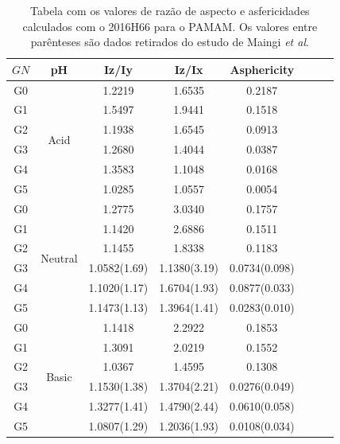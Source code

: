 \begin{table}
\centering
    \begin{tabular}{cccccccc}
 \hline
 $GN$     & pH  & Iz/Iy &   Iz/Ix   & Asphericity\\
 \hline
 \hline 
 G0     &  \multirow{6}{*}{Acid}    &   1.2219& 1.6535& 0.2187\\
 G1     &                           &   1.5497& 1.9441& 0.1518\\
 G2     &                           &   1.1938& 1.6545& 0.0913\\
 G3     &                           &   1.2680& 1.4044& 0.0387\\
 G4     &                           &   1.3583& 1.1048& 0.0168\\
 G5     &                           &   1.0285& 1.0557& 0.0054\\
 \hline 
 G0     &  \multirow{6}{*}{Neutral} &   1.2775& 3.0340& 0.1757\\
 G1     &                           &   1.1420& 2.6886& 0.1511\\
 G2     &                           &   1.1455& 1.8338& 0.1183\\
 G3     &                           &   1.0582(1.69)& 1.1380(3.19)& 0.0734(0.098)\\
 G4     &                           &   1.1020(1.17)& 1.6704(1.93)& 0.0877(0.033)\\
 G5     &                           &   1.1473(1.13)& 1.3964(1.41)& 0.0283(0.010)\\
 \hline 
 G0     &  \multirow{6}{*}{Basic}   &   1.1418& 2.2922& 0.1853\\
 G1     &                           &   1.3091& 2.0219& 0.1552\\
 G2     &                           &   1.0367& 1.4595& 0.1308\\
 G3     &                           &   1.1530(1.38)& 1.3704(2.21)& 0.0276(0.049)\\
 G4     &                           &   1.3277(1.41)& 1.4790(2.44)& 0.0610(0.058)\\
 G5     &                           &   1.0807(1.29)& 1.2036(1.93)& 0.0108(0.034)\\
 \hline
    \end{tabular}
\caption{Tabela com os valores de razão de aspecto e asfericidades calculados com o 2016H66 para o PAMAM.
Os valores entre parênteses são dados retirados do estudo de Maingi \textit{et al}\cite{Maingi2012}.}
\label{tab:PAMAMAsfericidade}
\end{table}

